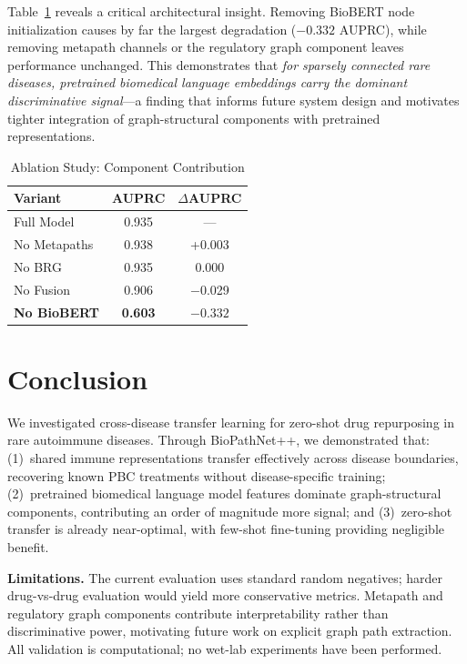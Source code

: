 \documentclass[conference]{IEEEtran}
\begin{document}
Table~\ref{tab:ablation} reveals a critical architectural insight. Removing BioBERT node initialization causes by far the largest degradation ($-0.332$ AUPRC), while removing metapath channels or the regulatory graph component leaves performance unchanged. This demonstrates that \textit{for sparsely connected rare diseases, pretrained biomedical language embeddings carry the dominant discriminative signal}---a finding that informs future system design and motivates tighter integration of graph-structural components with pretrained representations.

\begin{table}[!t]
\caption{Ablation Study: Component Contribution}
\label{tab:ablation}
\centering
\footnotesize
\renewcommand{\arraystretch}{1.3}
\begin{tabular}{lcc}
\toprule
\textbf{Variant} & \textbf{AUPRC} & $\Delta$\textbf{AUPRC} \\
\midrule
Full Model & 0.935 & --- \\
No Metapaths & 0.938 & +0.003 \\
No BRG & 0.935 & 0.000 \\
No Fusion & 0.906 & $-$0.029 \\
\textbf{No BioBERT} & \textbf{0.603} & $\mathbf{-0.332}$ \\
\bottomrule
\end{tabular}
\end{table}

\section{Conclusion}

We investigated cross-disease transfer learning for zero-shot drug repurposing in rare autoimmune diseases. Through BioPathNet++, we demonstrated that: (1)~shared immune representations transfer effectively across disease boundaries, recovering known PBC treatments without disease-specific training; (2)~pretrained biomedical language model features dominate graph-structural components, contributing an order of magnitude more signal; and (3)~zero-shot transfer is already near-optimal, with few-shot fine-tuning providing negligible benefit.

\textbf{Limitations.} The current evaluation uses standard random negatives; harder drug-vs-drug evaluation would yield more conservative metrics. Metapath and regulatory graph components contribute interpretability rather than discriminative power, motivating future work on explicit graph path extraction. All validation is computational; no wet-lab experiments have been performed.
\end{document}
